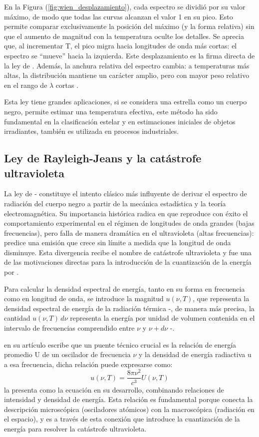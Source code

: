 \documentclass[11pt,a4paper,spanish]{book}
\begin{document}
En la Figura (\ref{fig:wien_desplazamiento}), cada espectro se
dividió por su valor máximo, de modo que todas las curvas alcanzan el
valor 1 en su pico. Esto permite comparar exclusivamente la posición
del máximo (y la forma relativa) sin que el aumento de magnitud con
la temperatura oculte los detalles. Se aprecia que, al incrementar T,
el pico migra hacia longitudes de onda más cortas: el espectro se
“mueve” hacia la izquierda. Este desplazamiento es la firma directa
de la ley de \cite{wien1893}. Además, la anchura relativa del espectro cambia: a
temperaturas más altas, la distribución mantiene un carácter amplio,
pero con mayor peso relativo en el rango de \(\lambda\)
cortas \cite{planck1901}.

Esta ley tiene grandes aplicaciones, si se considera una estrella
como un cuerpo negro, permite estimar una temperatura efectiva, este
método ha sido fundamental en la clasificación estelar y en
estimaciones iniciales de objetos irradiantes, también es utilizada
en procesos industriales.

\subsection{Ley de Rayleigh-Jeans y la catástrofe ultravioleta}
La ley de \cite{rayleigh1900}-\cite{jeans1905} constituye el intento
clásico más influyente
de derivar el espectro de radiación del cuerpo negro a partir de la
mecánica estadística y la teoría electromagnética. Su importancia
histórica radica en que reproduce con éxito el comportamiento
experimental en el régimen de longitudes de onda grandes (bajas
frecuencias), pero falla de manera dramática en el ultravioleta
(altas frecuencias): predice una emisión que crece sin límite a
medida que la longitud de onda disminuye.
Esta divergencia recibe el nombre de catástrofe ultravioleta y fue
una de las motivaciones
directas para la introducción de la cuantización de la energía por
\cite{planck1901}.

Para calcular la densidad espectral de energía, tanto en su forma en
frecuencia como
en longitud de onda, se introduce la magnitud \(u(\nu,T)\), que
representa la densidad
espectral de energía de la radiación térmica
\cite{rayleigh1900}-\cite{jeans1905},
de manera más precisa, la cantidad \(u(\nu,T)\,d\nu\) representa la
energía por unidad de
volumen contenida en el intervalo de frecuencias comprendido entre
\(\nu\) y \(\nu+d\nu\) \cite{rayleigh1900}-\cite{jeans1905}.

\cite{planck1901} en su artículo escribe que un puente técnico crucial es la
relación de energía promedio U de un oscilador de frecuencia \(\nu\)
y la densidad de energía radiactiva u a esa frecuencia, dicha
relación puede expresarse como:
\begin{equation}
  u(\nu, T) = \frac{8\pi\nu^2}{c^3} U(\nu, T)
\end{equation}
\cite{planck1901} la presenta como la ecuación en su desarrollo, combinando
relaciones de intensidad y densidad de energía. Esta relación es
fundamental porque conecta la descripción microscópica (osciladores
atómicos) con la macroscópica (radiación en el espacio), y es a
través de esta conexión que \cite{planck1900} introduce la cuantización de la
energía para resolver la catástrofe ultravioleta.
\end{document}

